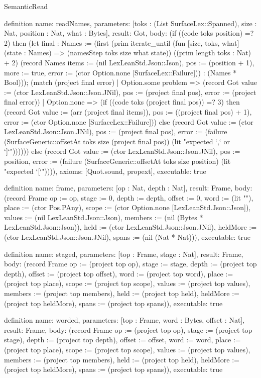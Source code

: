 \begin{lexlean}{SemanticRead}
\begin{semanticmodule}
definition{
  name: readNames,
  parameters: [toks : (List SurfaceLex::Spanned), size : Nat, position : Nat, what : Bytes],
  result: Got,
  body: (if ((code toks position) =? 2) then (let final : Names := (first (prim iterate_until (fun [size, toks, what] (state : Names) => (namesStep toks size what state)) ((prim length toks : Nat) + 2) (record Names {items := (nil LexLeanStd.Json::Json), pos := (position + 1), more := true, error := (ctor Option.none [SurfaceLex::Failure])}) : (Names * Bool))); (match (project final error)
    | Option.some problem => (record Got {value := (ctor LexLeanStd.Json::Json.JNil), pos := (project final pos), error := (project final error)})
    | Option.none => (if ((code toks (project final pos)) =? 3) then (record Got {value := (arr (project final items)), pos := ((project final pos) + 1), error := (ctor Option.none [SurfaceLex::Failure])}) else (record Got {value := (ctor LexLeanStd.Json::Json.JNil), pos := (project final pos), error := (failure (SurfaceGeneric::offsetAt toks size (project final pos)) (lit "expected `,` or `]`"))})))) else (record Got {value := (ctor LexLeanStd.Json::Json.JNil), pos := position, error := (failure (SurfaceGeneric::offsetAt toks size position) (lit "expected `[`"))})),
  axioms: [Quot.sound, propext],
  executable: true
}

definition{
  name: frame,
  parameters: [op : Nat, depth : Nat],
  result: Frame,
  body: (record Frame {op := op, stage := 0, depth := depth, offset := 0, word := (lit ""), place := (ctor Pos.PAny), scope := (ctor Option.none [LexLeanStd.Json::Json]), values := (nil LexLeanStd.Json::Json), members := (nil (Bytes * LexLeanStd.Json::Json)), held := (ctor LexLeanStd.Json::Json.JNil), heldMore := (ctor LexLeanStd.Json::Json.JNil), spans := (nil (Nat * Nat))}),
  executable: true
}

definition{
  name: staged,
  parameters: [top : Frame, stage : Nat],
  result: Frame,
  body: (record Frame {op := (project top op), stage := stage, depth := (project top depth), offset := (project top offset), word := (project top word), place := (project top place), scope := (project top scope), values := (project top values), members := (project top members), held := (project top held), heldMore := (project top heldMore), spans := (project top spans)}),
  executable: true
}

definition{
  name: worded,
  parameters: [top : Frame, word : Bytes, offset : Nat],
  result: Frame,
  body: (record Frame {op := (project top op), stage := (project top stage), depth := (project top depth), offset := offset, word := word, place := (project top place), scope := (project top scope), values := (project top values), members := (project top members), held := (project top held), heldMore := (project top heldMore), spans := (project top spans)}),
  executable: true
}


\end{semanticmodule}
\end{lexlean}
